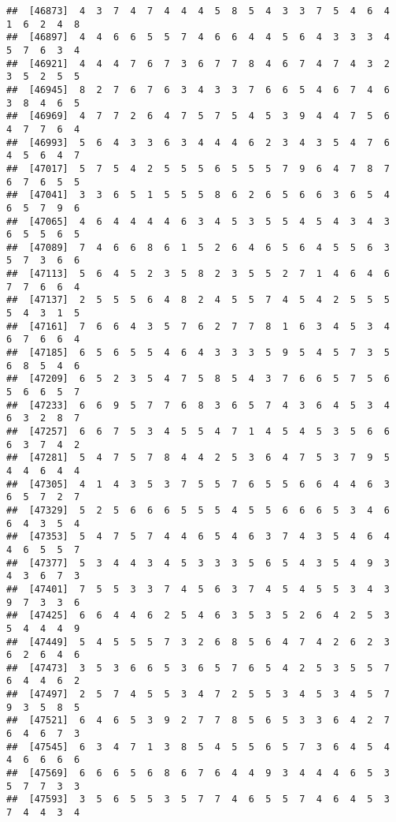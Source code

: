 \documentclass[
]{book}
\begin{document}
\begin{verbatim}
##  [46873]  4  3  7  4  7  4  4  4  5  8  5  4  3  3  7  5  4  6  4  1  6  2  4  8
##  [46897]  4  4  6  6  5  5  7  4  6  6  4  4  5  6  4  3  3  3  4  5  7  6  3  4
##  [46921]  4  4  4  7  6  7  3  6  7  7  8  4  6  7  4  7  4  3  2  3  5  2  5  5
##  [46945]  8  2  7  6  7  6  3  4  3  3  7  6  6  5  4  6  7  4  6  3  8  4  6  5
##  [46969]  4  7  7  2  6  4  7  5  7  5  4  5  3  9  4  4  7  5  6  4  7  7  6  4
##  [46993]  5  6  4  3  3  6  3  4  4  4  6  2  3  4  3  5  4  7  6  4  5  6  4  7
##  [47017]  5  7  5  4  2  5  5  5  6  5  5  5  7  9  6  4  7  8  7  6  7  6  5  5
##  [47041]  3  3  6  5  1  5  5  5  8  6  2  6  5  6  6  3  6  5  4  6  5  7  9  6
##  [47065]  4  6  4  4  4  4  6  3  4  5  3  5  5  4  5  4  3  4  3  6  5  5  6  5
##  [47089]  7  4  6  6  8  6  1  5  2  6  4  6  5  6  4  5  5  6  3  5  7  3  6  6
##  [47113]  5  6  4  5  2  3  5  8  2  3  5  5  2  7  1  4  6  4  6  7  7  6  6  4
##  [47137]  2  5  5  5  6  4  8  2  4  5  5  7  4  5  4  2  5  5  5  5  4  3  1  5
##  [47161]  7  6  6  4  3  5  7  6  2  7  7  8  1  6  3  4  5  3  4  6  7  6  6  4
##  [47185]  6  5  6  5  5  4  6  4  3  3  3  5  9  5  4  5  7  3  5  6  8  5  4  6
##  [47209]  6  5  2  3  5  4  7  5  8  5  4  3  7  6  6  5  7  5  6  5  6  6  5  7
##  [47233]  6  6  9  5  7  7  6  8  3  6  5  7  4  3  6  4  5  3  4  6  3  2  8  7
##  [47257]  6  6  7  5  3  4  5  5  4  7  1  4  5  4  5  3  5  6  6  6  3  7  4  2
##  [47281]  5  4  7  5  7  8  4  4  2  5  3  6  4  7  5  3  7  9  5  4  4  6  4  4
##  [47305]  4  1  4  3  5  3  7  5  5  7  6  5  5  6  6  4  4  6  3  6  5  7  2  7
##  [47329]  5  2  5  6  6  6  5  5  5  4  5  5  6  6  6  5  3  4  6  6  4  3  5  4
##  [47353]  5  4  7  5  7  4  4  6  5  4  6  3  7  4  3  5  4  6  4  4  6  5  5  7
##  [47377]  5  3  4  4  3  4  5  3  3  3  5  6  5  4  3  5  4  9  3  4  3  6  7  3
##  [47401]  7  5  5  3  3  7  4  5  6  3  7  4  5  4  5  5  3  4  3  9  7  3  3  6
##  [47425]  6  6  4  4  6  2  5  4  6  3  5  3  5  2  6  4  2  5  3  5  4  4  4  9
##  [47449]  5  4  5  5  5  7  3  2  6  8  5  6  4  7  4  2  6  2  3  6  2  6  4  6
##  [47473]  3  5  3  6  6  5  3  6  5  7  6  5  4  2  5  3  5  5  7  6  4  4  6  2
##  [47497]  2  5  7  4  5  5  3  4  7  2  5  5  3  4  5  3  4  5  7  9  3  5  8  5
##  [47521]  6  4  6  5  3  9  2  7  7  8  5  6  5  3  3  6  4  2  7  6  4  6  7  3
##  [47545]  6  3  4  7  1  3  8  5  4  5  5  6  5  7  3  6  4  5  4  4  6  6  6  6
##  [47569]  6  6  6  5  6  8  6  7  6  4  4  9  3  4  4  4  6  5  3  5  7  7  3  3
##  [47593]  3  5  6  5  5  3  5  7  7  4  6  5  5  7  4  6  4  5  3  7  4  4  3  4

\end{verbatim}
\end{document}
